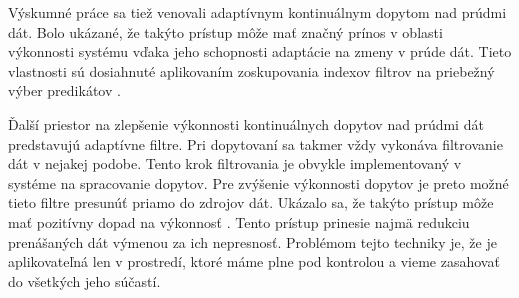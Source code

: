 Výskumné práce sa tiež venovali adaptívnym kontinuálnym dopytom nad prúdmi dát. Bolo ukázané, že takýto prístup môže mať značný prínos v oblasti výkonnosti systému vďaka jeho schopnosti adaptácie na zmeny v prúde dát. Tieto vlastnosti sú dosiahnuté aplikovaním zoskupovania indexov filtrov na priebežný výber predikátov \citep{madden2002continuously}. \par
Ďalší priestor na zlepšenie výkonnosti kontinuálnych dopytov nad prúdmi dát predstavujú adaptívne filtre. Pri dopytovaní sa takmer vždy vykonáva filtrovanie dát v nejakej podobe. Tento krok filtrovania je obvykle implementovaný v systéme na spracovanie dopytov. Pre zvýšenie výkonnosti dopytov je preto možné tieto filtre presunúť priamo do zdrojov dát. Ukázalo sa, že takýto prístup môže mať pozitívny dopad na výkonnosť \citep{olston2003adaptive}. Tento prístup prinesie najmä redukciu prenášaných dát výmenou za ich nepresnosť. Problémom tejto techniky je, že je aplikovateľná len v prostredí, ktoré máme plne pod kontrolou a vieme zasahovať do všetkých jeho súčastí.



